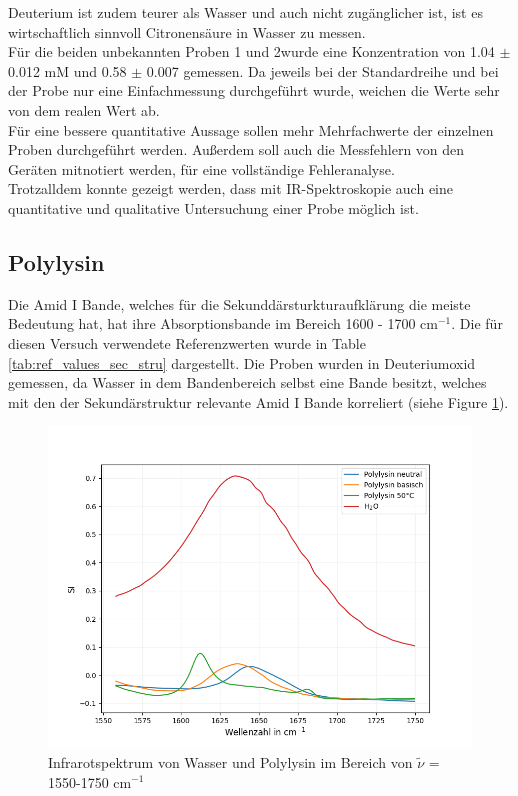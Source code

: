 \documentclass[10pt,a4paper]{article}
\begin{document}
				
				Deuterium ist zudem teurer als Wasser und auch nicht  zugänglicher ist, ist es wirtschaftlich sinnvoll Citronensäure in Wasser zu messen.\\
				Für die beiden unbekannten Proben 1 und 2wurde eine Konzentration von 1.04 $\pm$ 0.012 mM und 0.58 $\pm$ 0.007 gemessen.
				Da jeweils bei der Standardreihe und bei der Probe nur eine Einfachmessung durchgeführt wurde, weichen die Werte sehr von dem realen Wert ab.\\
				Für eine bessere quantitative Aussage sollen mehr Mehrfachwerte der einzelnen Proben durchgeführt werden. Außerdem soll auch die Messfehlern von den Geräten mitnotiert werden, für eine vollständige Fehleranalyse.\\
				Trotzalldem konnte gezeigt werden, dass mit IR-Spektroskopie auch eine quantitative und qualitative Untersuchung einer Probe möglich ist.
			
			
			\subsection{Polylysin}
				Die Amid I Bande, welches für die Sekunddärsturkturaufklärung die meiste Bedeutung hat, hat ihre Absorptionsbande im Bereich 1600 - 1700 cm$^{-1}$.
				Die für diesen Versuch verwendete Referenzwerten wurde in Table \ref{tab:ref_values_sec_stru} dargestellt.
				Die Proben wurden in Deuteriumoxid gemessen, da Wasser in dem Bandenbereich selbst eine Bande besitzt, welches mit den der Sekundärstruktur relevante Amid I Bande korreliert (siehe Figure \ref{fig:water_polylysin_full}).\\
				
				
				\begin{figure}[H]
					\centering
					\includegraphics[scale=0.65]{water_polylysin.png}
					\caption{Infrarotspektrum von Wasser und Polylysin im Bereich von $\tilde{\nu}$ = 1550-1750 cm$^{-1}$}
					\label{fig:water_polylysin_full}
				\end{figure}
				
\end{document}
